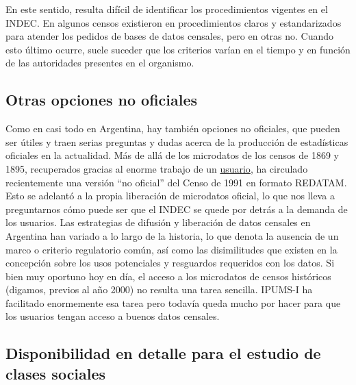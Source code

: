 \documentclass[
]{book}
\begin{document}
En este sentido, resulta difícil de identificar los procedimientos vigentes en el INDEC. En algunos censos existieron en procedimientos claros y estandarizados para atender los pedidos de bases de datos censales, pero en otras no. Cuando esto último ocurre, suele suceder que los criterios varían en el tiempo y en función de las autoridades presentes en el organismo.

\hypertarget{otras-opciones-no-oficiales}{%
\subsection{Otras opciones no oficiales}\label{otras-opciones-no-oficiales}}

Como en casi todo en Argentina, hay también opciones no oficiales, que pueden ser útiles y traen serias preguntas y dudas acerca de la producción de estadísticas oficiales en la actualidad. Más de allá de los microdatos de los censos de 1869 y 1895, recuperados gracias al enorme trabajo de un \href{https://observatoriocensal.org/2015/12/01/recuperacion-de-microdatos-de-los-censos-argentinos-de-poblacion-1869-1895/}{usuario}, ha circulado recientemente una versión ``no oficial'' del Censo de 1991 en formato REDATAM. Esto se adelantó a la propia liberación de microdatos oficial, lo que nos lleva a preguntarnos cómo puede ser que el INDEC se quede por detrás a la demanda de los usuarios. Las estrategias de difusión y liberación de datos censales en Argentina han variado a lo largo de la historia, lo que denota la ausencia de un marco o criterio regulatorio común, así como las disimilitudes que existen en la concepción sobre los usos potenciales y resguardos requeridos con los datos. Si bien muy oportuno hoy en día, el acceso a los microdatos de censos históricos (digamos, previos al año 2000) no resulta una tarea sencilla. IPUMS-I ha facilitado enormemente esa tarea pero todavía queda mucho por hacer para que los usuarios tengan acceso a buenos datos censales.

\hypertarget{disponibilidad-en-detalle-para-el-estudio-de-clases-sociales}{%
\subsection{Disponibilidad en detalle para el estudio de clases sociales}\label{disponibilidad-en-detalle-para-el-estudio-de-clases-sociales}}
\end{document}
